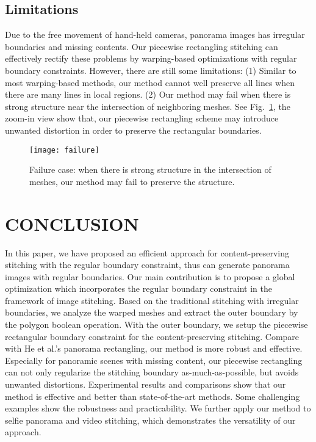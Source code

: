 \documentclass[10pt,journal,compsoc]{IEEEtran}
\begin{document}
  \subsection{Limitations}
Due to the free movement of hand-held cameras, panorama images has irregular boundaries and missing contents.
Our piecewise rectangling stitching can effectively rectify these problems by warping-based optimizations with regular boundary constraints.
However, there are still some limitations:
(1) Similar to most warping-based methods, our method cannot well preserve all lines when there are many lines in local regions.
(2) Our method may fail when there is strong structure near the intersection of neighboring meshes. 
See Fig.~\ref{fig:failure}, the zoom-in view show that, our piecewise rectangling scheme may introduce unwanted distortion in order to preserve the rectangular boundaries.

 \begin{figure} %
  \centering
  \texttt{[image: failure]}
  \caption{Failure case: when there is strong structure in the intersection of meshes, our method may fail to preserve the structure.} \label{fig:failure}
\end{figure}

 \section{CONCLUSION}
In this paper, we have proposed an efficient approach for content-preserving stitching with the regular boundary constraint, thus can generate panorama images with regular boundaries.
Our main contribution is to propose a global optimization which incorporates the regular boundary constraint in the framework of image stitching.
Based on the traditional stitching with irregular boundaries, we analyze the warped meshes and extract the outer boundary by the polygon boolean operation.
With the outer boundary, we setup the piecewise rectangular boundary constraint for the content-preserving stitching.
Compare with He et al.'s panorama rectangling, our method is more robust and effective.
Especially for panoramic scenes with missing content, our piecewise rectangling can not only regularize the stitching boundary as-much-as-possible, but avoids unwanted distortions.
Experimental results and comparisons show that our method is effective and better than state-of-the-art methods. Some challenging examples show the robustness and practicability.
We further apply our method to selfie panorama and video stitching, which demonstrates the versatility of our approach.
\end{document}
